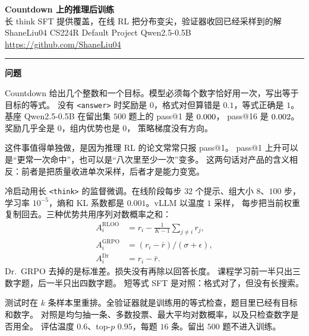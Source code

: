 \documentclass[10pt]{ctexart}
\begin{document}
\fontsize{17}{21}\selectfont

\noindent\textcolor{band}{\fontsize{42}{46}\selectfont\bfseries Countdown 上的推理后训练}\\[0.05em]
{\fontsize{20}{24}\selectfont 长 think SFT 提供覆盖，在线 RL 把分布变尖，验证器收回已经采样到的解}\\[0.08em]
{\normalsize ShaneLiu04 \quad CS224R Default Project \quad Qwen2.5-0.5B \quad
\url{https://github.com/ShaneLiu04}}\\[0.06em]
{\color{band}\rule{\textwidth}{2.5pt}}\vspace{0.15em}

\noindent
\begin{minipage}[t]{0.315\textwidth}
{\color{accent}\bfseries\fontsize{22}{26}\selectfont 问题}\par\vspace{0.2em}
Countdown 给出几个整数和一个目标。模型必须每个数字恰好用一次，写出等于目标的等式。
没有 \texttt{<answer>} 时奖励是 $0$，格式对但算错是 $0.1$，等式正确是 $1$。
基座 Qwen2.5-0.5B 在留出集 $500$ 题上的 pass@1 是 $0.000$，
pass@16 是 $0.002$。奖励几乎全是 $0$，组内优势也是 $0$，
策略梯度没有方向。

这件事值得单独做，是因为推理 RL 的论文常常只报 pass@1。
pass@1 上升可以是``更常一次命中''，也可以是``八次里至少一次''变多。
这两句话对产品的含义相反：前者是把质量收进单次采样，后者才是能力变宽。

\par\vspace{0.2em}
冷启动用长 \texttt{<think>} 的监督微调。在线阶段每步 $32$ 个提示、组大小 $8$、$100$ 步，
学习率 $10^{-5}$，熵和 KL 系数都是 $0.001$。vLLM 以温度 $1$ 采样，
每步把当前权重复制回去。三种优势共用序列对数概率之和：
\begin{align*}
A^{\mathrm{RLOO}}_i &= r_i - \tfrac{1}{K-1}\sum_{j\neq i} r_j,\\
A^{\mathrm{GRPO}}_i &= (r_i-\bar r)/(\sigma+\epsilon),\\
A^{\mathrm{Dr}}_i &= r_i-\bar r.
\end{align*}
Dr.\ GRPO 去掉的是标准差。损失没有再除以回答长度。
课程学习前一半只出三数字题，后一半只出四数字题。
短等式 SFT 是对照：格式对了，但没有长搜索。

测试时在 $k$ 条样本里重排。全验证器就是训练用的等式检查，题目里已经有目标和数字。
对照是均匀抽一条、多数投票、最大平均对数概率，以及只检查数字是否用全。
评估温度 $0.6$、top-$p$ $0.95$，每题 $16$ 条。留出 $500$ 题不进入训练。
\end{minipage}\hfill
\end{document}
